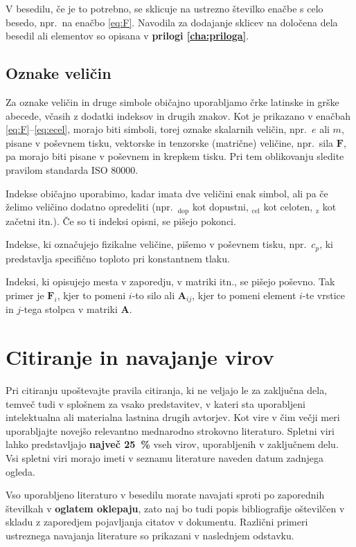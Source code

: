 V besedilu, če je to potrebno, se sklicuje na ustrezno številko enačbe s celo besedo, npr.~na enačbo \eqref{eq:F}. Navodila za dodajanje sklicev na določena dela besedil ali elementov so opisana v \textbf{prilogi \ref{cha:priloga}}.

\subsection{Oznake veličin}\label{sec:oznake_velicin}
Za oznake veličin in druge simbole običajno uporabljamo črke latinske in grške abecede, včasih z dodatki indeksov in drugih znakov. Kot je prikazano v enačbah \eqref{eq:F}--\eqref{eq:ecel}, morajo biti simboli, torej oznake skalarnih veličin, npr.~$e$ ali $m$, pisane v poševnem tisku, vektorske in tenzorske (matrične) veličine, npr.~sila $\bm{F}$, pa morajo biti pisane v poševnem in krepkem tisku. Pri tem oblikovanju sledite pravilom standarda ISO 80000.

Indekse običajno uporabimo, kadar imata dve veličini enak simbol, ali pa če želimo veličino dodatno opredeliti (npr.~$_\mathrm{dop}$ kot dopustni, $_\mathrm{cel}$ kot celoten, $_\mathrm{z}$ kot začetni itn.). Če so ti indeksi opisni, se pišejo pokonci.

Indekse, ki označujejo fizikalne veličine, pišemo v poševnem tisku, npr.~$c_p$, ki predstavlja specifično toploto pri konstantnem tlaku.

Indeksi, ki opisujejo mesta v zaporedju, v matriki itn., se pišejo poševno. Tak primer je $\bm{F}_i$, kjer to pomeni $i$-to silo ali $\bm{A}_{ij}$, kjer to pomeni element $i$-te vrstice in $j$-tega stolpca v matriki $\bm{A}$.


\section{Citiranje in navajanje virov}\label{sec:citiranje}
Pri citiranju upoštevajte pravila citiranja, ki ne veljajo le za zaključna dela, temveč tudi v splošnem za vsako predstavitev, v kateri sta uporabljeni intelektualna ali materialna lastnina drugih avtorjev. Kot vire v čim večji meri uporabljajte novejšo relevantno mednarodno strokovno literaturo. Spletni viri lahko predstavljajo \textbf{največ 25~\%} vseh virov, uporabljenih v zaključnem delu. Vsi spletni viri morajo imeti v seznamu literature naveden datum zadnjega ogleda.

Vso uporabljeno literaturo v besedilu morate navajati sproti po zaporednih številkah v \textbf{oglatem oklepaju}, zato naj bo tudi popis bibliografije oštevilčen v skladu z zaporedjem pojavljanja citatov v dokumentu. Različni primeri ustreznega navajanja literature so prikazani v naslednjem odstavku.

